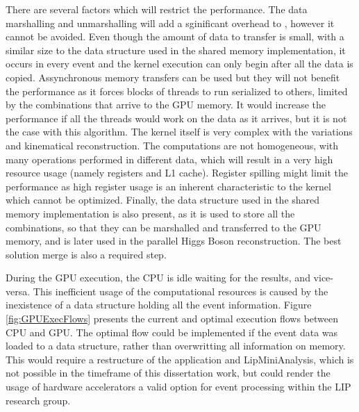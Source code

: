 There are several factors which will restrict the performance. The data marshalling and unmarshalling will add a sginificant overhead to \ttDilepKinFit, however it cannot be avoided. Even though the amount of data to transfer is small, with a similar size to the data structure used in the shared memory implementation, it occurs in every event and the kernel execution can only begin after all the data is copied. Assynchronous memory transfers can be used but they will not benefit the performance as it forces blocks of threads to run serialized to others, limited by the combinations that arrive to the GPU memory. It would increase the performance if all the threads would work on the data as it arrives, but it is not the case with this algorithm. The kernel itself is very complex with the variations and kinematical reconstruction. The computations are not homogeneous, with many operations performed in different data, which will result in a very high resource usage (namely registers and L1 cache). Register spilling might limit the performance as high register usage is an inherent characteristic to the kernel which cannot be optimized. Finally, the data structure used in the shared memory implementation is also present, as it is used to store all the combinations, so that they can be marshalled and transferred to the GPU memory, and is later used in the parallel Higgs Boson reconstruction. The best solution merge is also a required step.

During the GPU execution, the CPU is idle waiting for the results, and vice-versa. This inefficient usage of the computational resources is caused by the inexistence of a data structure holding all the event information. Figure \ref{fig:GPUExecFlows} presents the current and optimal execution flows between CPU and GPU. The optimal flow could be implemented if the event data was loaded to a data structure, rather than overwritting all information on memory. This would require a restructure of the application and LipMiniAnalysis, which is not possible in the timeframe of this dissertation work, but could render the usage of hardware accelerators a valid option for event processing within the LIP research group.

